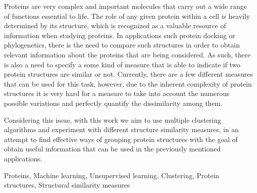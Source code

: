 

Proteins are very complex and important molecules that carry out a wide range of functions essential to life. The role of any given protein within a cell is heavily determined by its structure, which is recognized as a valuable resource of information when studying proteins. In applications such protein docking or phylogenetics, there is the need to compare such structures in order to obtain relevant information about the proteins that are being considered. As such, there is also a need to specify a some kind of measure that is able to indicate if two protein structures are similar or not. Currently, there are a few different measures that can be used for this task, however, due to the inherent complexity of protein structures it is very hard for a measure to take into account the numerous possible variations and perfectly quantify the dissimilarity among them. 

Considering this issue, with this work we aim to use multiple clustering algorithms and experiment with different structure similarity measures, in an attempt to find effective ways of grouping protein structures with the goal of obtain useful information that can be used in the previously mentioned applications.

\begin{keywords}
Proteins, Machine learning, Unsupervised learning, Clustering, Protein structures, Structural similarity measures
\end{keywords} 
